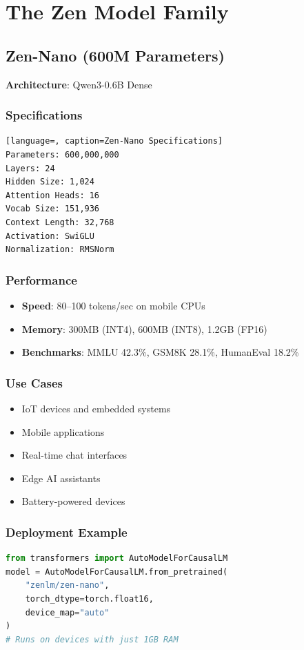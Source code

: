 \documentclass[11pt,a4paper]{article}
\begin{document}
\section{The Zen Model Family}

\subsection{Zen-Nano (600M Parameters)}
\textbf{Architecture}: Qwen3-0.6B Dense

\subsubsection{Specifications}
\begin{lstlisting}[language=, caption=Zen-Nano Specifications]
Parameters: 600,000,000
Layers: 24
Hidden Size: 1,024
Attention Heads: 16
Vocab Size: 151,936
Context Length: 32,768
Activation: SwiGLU
Normalization: RMSNorm
\end{lstlisting}

\subsubsection{Performance}
\begin{itemize}
    \item \textbf{Speed}: 80--100 tokens/sec on mobile CPUs
    \item \textbf{Memory}: 300MB (INT4), 600MB (INT8), 1.2GB (FP16)
    \item \textbf{Benchmarks}: MMLU 42.3\%, GSM8K 28.1\%, HumanEval 18.2\%
\end{itemize}

\subsubsection{Use Cases}
\begin{itemize}
    \item IoT devices and embedded systems
    \item Mobile applications
    \item Real-time chat interfaces
    \item Edge AI assistants
    \item Battery-powered devices
\end{itemize}

\subsubsection{Deployment Example}
\begin{lstlisting}[language=Python]
from transformers import AutoModelForCausalLM
model = AutoModelForCausalLM.from_pretrained(
    "zenlm/zen-nano",
    torch_dtype=torch.float16,
    device_map="auto"
)
# Runs on devices with just 1GB RAM
\end{lstlisting}
\end{document}
